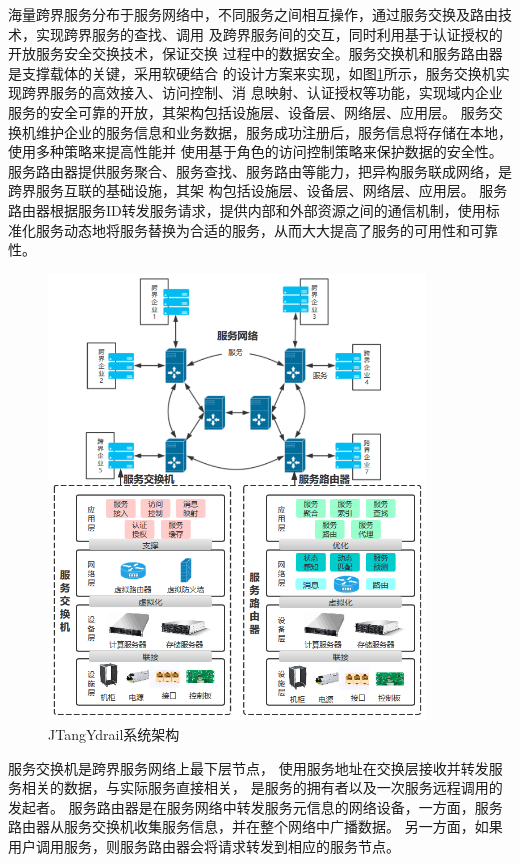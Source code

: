   海量跨界服务分布于服务网络中，不同服务之间相互操作，通过服务交换及路由技术，实现跨界服务的查找、调用
  及跨界服务间的交互，同时利用基于认证授权的开放服务安全交换技术，保证交换
  过程中的数据安全。服务交换机和服务路由器是支撑载体的关键，采用软硬结合
  的设计方案来实现，如图\ref{fig:system}所示，服务交换机实现跨界服务的高效接入、访问控制、消
  息映射、认证授权等功能，实现域内企业服务的安全可靠的开放，其架构包括设施层、设备层、网络层、应用层\cite{刘皇敏2019跨界服务网络关键技术研究}。
  服务交换机维护企业的服务信息和业务数据，服务成功注册后，服务信息将存储在本地，使用多种策略来提高性能并
  使用基于角色的访问控制策略来保护数据的安全性。
  服务路由器提供服务聚合、服务查找、服务路由等能力，把异构服务联成网络，是跨界服务互联的基础设施，其架
  构包括设施层、设备层、网络层、应用层。
  服务路由器根据服务ID转发服务请求，提供内部和外部资源之间的通信机制，使用标准化服务动态地将服务替换为合适的服务，从而大大提高了服务的可用性和可靠性。
  \begin{figure}[htbp]
    \centering
    \includegraphics[width=10cm]{./images/system.png}
    \caption{JTangYdrail系统架构\cite{zhanghuan}}
    \label{fig:system}
  \end{figure}

  服务交换机是跨界服务网络上最下层节点，
  使用服务地址在交换层接收并转发服务相关的数据，与实际服务直接相关，
  是服务的拥有者以及一次服务远程调用的发起者。
    服务路由器是在服务网络中转发服务元信息的网络设备，一方面，服务路由器从服务交换机收集服务信息，并在整个网络中广播数据。 
    另一方面，如果用户调用服务，则服务路由器会将请求转发到相应的服务节点。 

